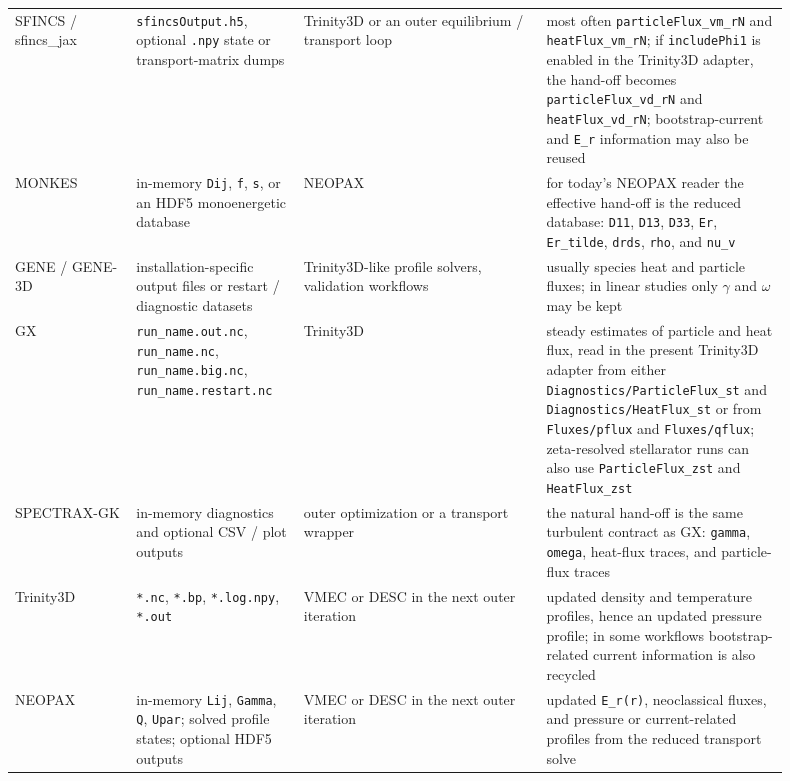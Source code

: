 \documentclass[11pt]{article}
\newcommand{\code}[1]{\texttt{#1}}
\begin{document}
{\begin{longtable}{L{0.14\linewidth}L{0.19\linewidth}L{0.28\linewidth}L{0.29\linewidth}}
SFINCS / sfincs\_jax &
\code{sfincsOutput.h5}, optional \code{.npy} state or transport-matrix dumps &
Trinity3D or an outer equilibrium / transport loop &
most often \code{particleFlux\_vm\_rN} and \code{heatFlux\_vm\_rN}; if
\code{includePhi1} is enabled in the Trinity3D adapter, the hand-off becomes
\code{particleFlux\_vd\_rN} and \code{heatFlux\_vd\_rN}; bootstrap-current and
\code{E\_r} information may also be reused \\

MONKES &
in-memory \code{Dij}, \code{f}, \code{s}, or an HDF5 monoenergetic database &
NEOPAX &
for today's NEOPAX reader the effective hand-off is the reduced database:
\code{D11}, \code{D13}, \code{D33}, \code{Er}, \code{Er\_tilde},
\code{drds}, \code{rho}, and \code{nu\_v} \\

GENE / GENE-3D &
installation-specific output files or restart / diagnostic datasets &
Trinity3D-like profile solvers, validation workflows &
usually species heat and particle fluxes; in linear studies only
\(\gamma\) and \(\omega\) may be kept \\

GX &
\code{run\_name.out.nc}, \code{run\_name.nc}, \code{run\_name.big.nc},
\code{run\_name.restart.nc} &
Trinity3D &
steady estimates of particle and heat flux, read in the present Trinity3D
adapter from either \code{Diagnostics/ParticleFlux\_st} and
\code{Diagnostics/HeatFlux\_st} or from \code{Fluxes/pflux} and
\code{Fluxes/qflux}; zeta-resolved stellarator runs can also use
\code{ParticleFlux\_zst} and \code{HeatFlux\_zst} \\

SPECTRAX-GK &
in-memory diagnostics and optional CSV / plot outputs &
outer optimization or a transport wrapper &
the natural hand-off is the same turbulent contract as GX:
\code{gamma}, \code{omega}, heat-flux traces, and particle-flux traces \\

Trinity3D &
\code{*.nc}, \code{*.bp}, \code{*.log.npy}, \code{*.out} &
VMEC or DESC in the next outer iteration &
updated density and temperature profiles, hence an updated pressure profile;
in some workflows bootstrap-related current information is also recycled \\

NEOPAX &
in-memory \code{Lij}, \code{Gamma}, \code{Q}, \code{Upar}; solved profile
states; optional HDF5 outputs &
VMEC or DESC in the next outer iteration &
updated \code{E\_r(r)}, neoclassical fluxes, and pressure or current-related
profiles from the reduced transport solve \\
\bottomrule
\end{longtable}
}
\end{document}
